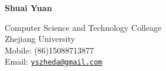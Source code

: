 \documentclass[letterpaper]{article}
\def\name{Shuai Yuan}
\begin{document}
\centerline{\huge\bf \name} \vspace{0.25in}
\begin{minipage}[t]{0.8\textwidth}
Computer Science and Technology Colleage \\
Zhejiang University\\
Mobile: (86)15088713877   \\
Email: \href{mailto:yszheda@gmail.com}{\tt yszheda@gmail.com}\\
\end{minipage}

\end{document}
